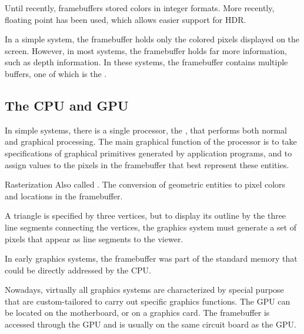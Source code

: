 \documentclass[\main/notes.tex]{subfiles}
\begin{document}
        Until recently, framebuffers stored colors in integer formats.
        More recently, floating point has been used, which allows easier support for HDR.

        In a simple system, the framebuffer holds only the colored pixels displayed on the screen.
        However, in most systems, the framebuffer holds far more information, such as depth
        information.
        In these systems, the framebuffer contains multiple buffers, one of which is the
        .

      \subsection{The CPU and GPU}
        In simple systems, there is a single processor, the ,
        that performs both normal and graphical processing.
        The main graphical function of the processor is to take specifications of graphical
        primitives generated by application programs,
        and to assign values to the pixels in the framebuffer that best represent these entities.

        \begin{definition}{Rasterization}
          Also called .
          The conversion of geometric entities to pixel colors and locations in the framebuffer.

          \begin{example}
            A triangle is specified by three vertices,
            but to display its outline by the three line segments connecting the vertices,
            the graphics system must generate a set of pixels that appear as line segments to the
            viewer.
          \end{example}
        \end{definition}

        In early graphics systems, the framebuffer was part of the standard memory
        that could be directly addressed by the CPU.

        Nowadays, virtually all graphics systems are characterized by special purpose
         that are custom-tailored
        to carry out specific graphics functions.
        The GPU can be located on the motherboard, or on a graphics card.
        The framebuffer is accessed through the GPU and is usually on the same circuit board
        as the GPU.
      \pagebreak
\end{document}
